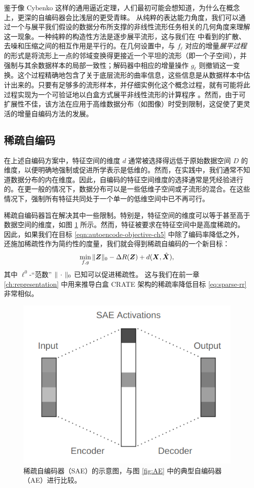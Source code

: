 \documentclass[../../book-main.tex]{subfiles}
\begin{document}
鉴于像 Cybenko 这样的通用逼近定理，人们最初可能会想知道，为什么在概念上，更深的自编码器会比浅层的更受青睐。
从纯粹的表达能力角度，我们可以通过一个与展平我们假设的数据分布所支撑的非线性流形任务相关的几何角度来理解这一现象。一种纯粹的构造性方法是逐步展平流形，这与我们在  中看到的扩散、去噪和压缩之间的相互作用是平行的。在几何设置中，与 $f_{\ell}$ 对应的增量\textit{展平过程}的形式是将流形上一点的邻域变换得更接近一个平坦的流形（即一个子空间），并强制与其余数据样本的局部一致性；解码器中相应的增量操作 $g_{\ell}$ 则撤销这一变换。这个过程精确地包含了关于底层流形的曲率信息，这些信息是从数据样本中估计出来的。只要有足够多的流形样本，并仔细实例化这个概念过程，就有可能将此过程实现为一个可验证地以白盒方式展平非线性流形的计算程序 \cite{Psenka-JMLR24}。然而，由于可扩展性不佳，该方法在应用于高维数据分布（如图像）时受到限制，这促使了更灵活的增量自编码方法的发展。

\subsection{稀疏自编码}
在上述自编码方案中，特征空间的维度 $d$ 通常被选择得远低于原始数据空间 $D$ 的维度，以便明确地强制或促进所学表示是低维的。然而，在实践中，我们通常不知道数据分布的内在维度。因此，自编码的特征空间维度的选择通常是凭经验进行的。在更一般的情况下，数据分布可以是一些低维子空间或子流形的混合。在这些情况下，强制所有特征共同处于一个单一的低维空间中已不再可行。

稀疏自编码器旨在解决其中一些限制。特别是，特征空间的维度可以等于甚至高于数据空间的维度，如图 \ref{fig:SAE} 所示。然而，特征被要求在特征空间中是高度稀疏的。因此，如果我们在目标 \eqref{eqn:autoencode-objective-ch5} 中除了编码率降低之外，还施加稀疏性作为简约性的度量，我们就会得到稀疏自编码的一个新目标：
\begin{equation}
  \min_{f, g}
  \|\bm{Z}\|_0 - \Delta R(\bm{Z}) + d(\bm{X}, \hat {\bm{X}}),
  \label{eqn:autoencode-sparse}
\end{equation}
其中 $\ell^0$-“范数” $\|\,\cdot\,\|_0$ 已知可以促进稀疏性。
这与我们在前一章 \ref{ch:representation} 中用来推导白盒 CRATE 架构的稀疏率降低目标 \eqref{eq:sparse-rr} 非常相似。

\begin{figure}
  \centering
  \includegraphics[width=0.5\linewidth]{figs_chap5/SAE_diagram.png}
  \caption{稀疏自编码器（SAE）的示意图，与图 \ref{fig:AE} 中的典型自编码器（AE）进行比较。}
  \label{fig:SAE}
\end{figure}
\end{document}
